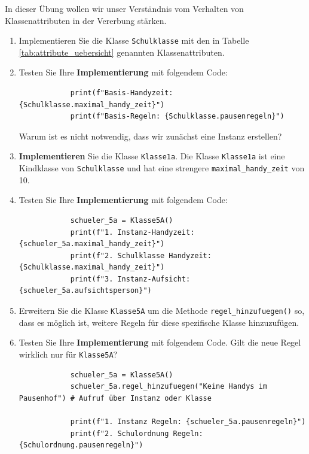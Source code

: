 \begin{myexercise}
    In dieser Übung wollen wir unser Verständnis vom Verhalten von Klassenattributen in der Vererbung stärken.

    \begin{enumerate}
        \item Implementieren Sie die Klasse \texttt{Schulklasse} mit den in Tabelle \ref{tab:attribute_uebersicht} genannten Klassenattributen.
        \item Testen Sie Ihre \textbf{Implementierung} mit folgendem Code:
        \begin{lstlisting}
            print(f"Basis-Handyzeit: {Schulklasse.maximal_handy_zeit}")
            print(f"Basis-Regeln: {Schulklasse.pausenregeln}")
        \end{lstlisting}
        Warum ist es nicht notwendig, dass wir zunächst eine Instanz erstellen?
        \item \textbf{Implementieren} Sie die Klasse \texttt{Klasse1a}. Die Klasse \texttt{Klasse1a} ist eine Kindklasse von \texttt{Schulklasse} und hat eine strengere \texttt{maximal\_handy\_zeit} von 10. 
        \item Testen Sie Ihre \textbf{Implementierung} mit folgendem Code:
        \begin{lstlisting}
            schueler_5a = Klasse5A()
            print(f"1. Instanz-Handyzeit: {schueler_5a.maximal_handy_zeit}")
            print(f"2. Schulklasse Handyzeit: {Schulklasse.maximal_handy_zeit}")
            print(f"3. Instanz-Aufsicht: {schueler_5a.aufsichtsperson}")
        \end{lstlisting}
        \item Erweitern Sie die Klasse \texttt{Klasse5A} um die Methode \texttt{regel\_hinzufuegen()} so, dass es möglich ist, weitere Regeln für diese spezifische Klasse hinzuzufügen.
        \item Testen Sie Ihre \textbf{Implementierung} mit folgendem Code. Gilt die neue Regel wirklich nur für \texttt{Klasse5A}?
        \begin{lstlisting}
            schueler_5a = Klasse5A()
            schueler_5a.regel_hinzufuegen("Keine Handys im Pausenhof") # Aufruf über Instanz oder Klasse

            print(f"1. Instanz Regeln: {schueler_5a.pausenregeln}")
            print(f"2. Schulordnung Regeln: {Schulordnung.pausenregeln}")
        \end{lstlisting}
    \end{enumerate} 
\end{myexercise}

